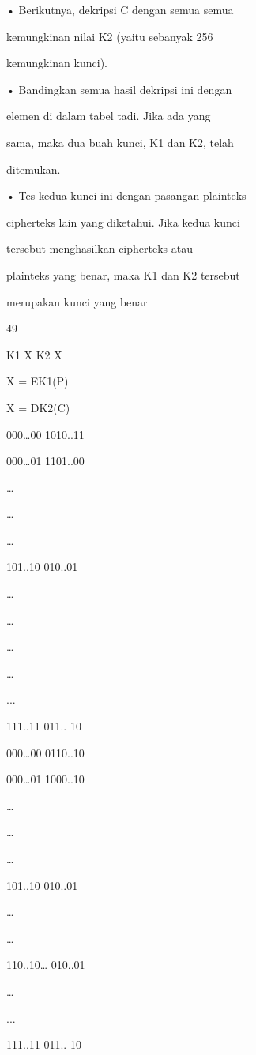 \documentclass{article}
\begin{document}

• Berikutnya, dekripsi C dengan semua semua 

kemungkinan nilai K2 (yaitu sebanyak 256 

kemungkinan kunci).

• Bandingkan semua hasil dekripsi ini dengan 

elemen di dalam tabel tadi. Jika ada yang 

sama, maka dua buah kunci, K1 dan K2, telah 

ditemukan. 

• Tes kedua kunci ini dengan pasangan plainteks-

cipherteks lain yang diketahui. Jika kedua kunci 

tersebut menghasilkan cipherteks atau 

plainteks yang benar, maka K1 dan K2 tersebut 

merupakan kunci yang benar  

49

K1             X                            K2           X

X = EK1(P)

X = DK2(C)

000…00       1010..11

000…01       1101..00

…

…

…

101..10         010..01

…

…

… 

…

...

111..11        011.. 10

000…00       0110..10

000…01       1000..10

…

…

…

101..10         010..01

…

…

110..10…     010..01 

…

...

111..11        011.. 10
\end{document}
